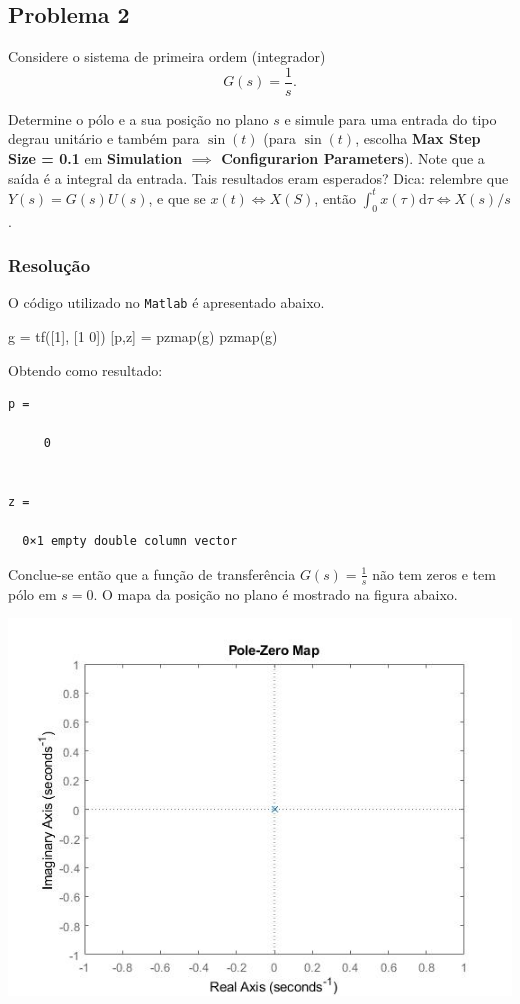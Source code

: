 \documentclass[
]{book}
\newenvironment{Shaded}{\begin{snugshade}}{\end{snugshade}}
\newcommand{\FloatTok}[1]{\textcolor[rgb]{0.00,0.00,0.81}{#1}}
\newcommand{\NormalTok}[1]{#1}
\begin{document}
\hypertarget{problema-2}{%
\subsection*{Problema 2}\label{problema-2}}

Considere o sistema de primeira ordem (integrador)
\[
G(s) = \frac {1}{s}.
\]

Determine o pólo e a sua posição no plano \(s\) e simule para uma entrada do tipo degrau unitário e também para \(\sin {(t)}\) (para \(\sin {(t)}\), escolha \textbf{Max Step Size = 0.1} em \textbf{Simulation \(\implies\) Configurarion Parameters}). Note que a saída é a integral da entrada. Tais resultados eram esperados? Dica: relembre que \(Y(s) = G(s)U(s)\), e que se \(x(t) \iff X(S)\), então \(\int_0^t x(\tau) \mathrm{d}\tau \iff X(s)/s\).

\hypertarget{resoluuxe7uxe3o-1}{%
\subsubsection*{Resolução}\label{resoluuxe7uxe3o-1}}

O código utilizado no \texttt{Matlab} é apresentado abaixo.

\begin{Shaded}
\begin{Highlighting}[]
\NormalTok{g = tf([}\FloatTok{1}\NormalTok{], [}\FloatTok{1} \FloatTok{0}\NormalTok{])}
\NormalTok{[p,z] = pzmap(g)}
\NormalTok{pzmap(g)}
\end{Highlighting}
\end{Shaded}

Obtendo como resultado:

\begin{verbatim}
p =

     0


z =

  0×1 empty double column vector
\end{verbatim}

Conclue-se então que a função de transferência \(G(s) = \frac {1}{s}\) não tem zeros e tem pólo em \(s = 0\). O mapa da posição no plano é mostrado na figura abaixo.

\includegraphics{Imagens/Lab2/prob2.jpg}
\end{document}
